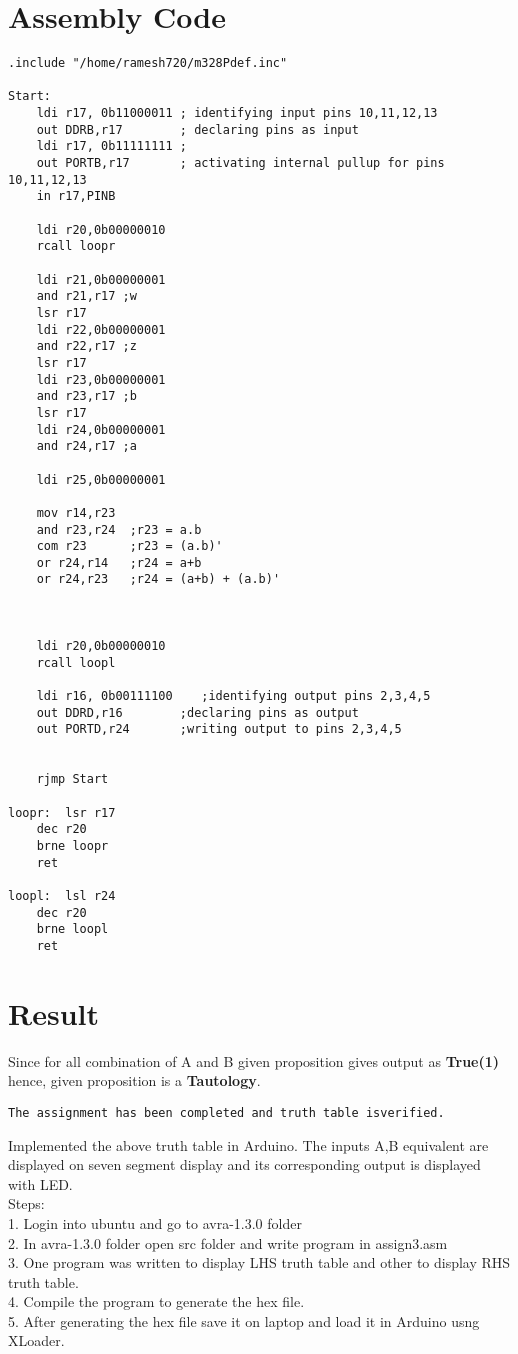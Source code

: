 \documentclass{article}
\begin{document}
\section{Assembly Code}
\begin{verbatim}
.include "/home/ramesh720/m328Pdef.inc"

Start:
	ldi r17, 0b11000011 ; identifying input pins 10,11,12,13
	out DDRB,r17		; declaring pins as input
	ldi r17, 0b11111111 ;
	out PORTB,r17		; activating internal pullup for pins 10,11,12,13  
	in r17,PINB
	
	ldi r20,0b00000010
	rcall loopr
	
	ldi r21,0b00000001
	and r21,r17 ;w
	lsr r17
	ldi r22,0b00000001
	and r22,r17 ;z
	lsr r17
	ldi r23,0b00000001
	and r23,r17 ;b
	lsr r17
	ldi r24,0b00000001
	and r24,r17 ;a

	ldi r25,0b00000001
	
	mov r14,r23
	and r23,r24  ;r23 = a.b
	com r23      ;r23 = (a.b)'
	or r24,r14   ;r24 = a+b
	or r24,r23   ;r24 = (a+b) + (a.b)'



	ldi r20,0b00000010
	rcall loopl

	ldi r16, 0b00111100    ;identifying output pins 2,3,4,5
	out DDRD,r16		;declaring pins as output
	out PORTD,r24		;writing output to pins 2,3,4,5
	

	rjmp Start

loopr:	lsr r17
	dec r20
	brne loopr
	ret

loopl:	lsl r24
	dec r20
	brne loopl
	ret
\end{verbatim}

\section{Result}
Since for all combination of A and B given proposition gives output as \textbf{True(1)} hence, given proposition is a \textbf{Tautology}. 
\begin{verbatim}
The assignment has been completed and truth table isverified.
\end{verbatim}
Implemented the above truth table in Arduino. The inputs A,B equivalent are displayed on seven segment display and its corresponding output is displayed with LED.\\
Steps: \\
1. Login into ubuntu and go to avra-1.3.0 folder\\
2. In avra-1.3.0 folder open src folder and write program in assign3.asm\\
3. One program was written to display LHS truth table and other to display RHS truth table.\\
4. Compile the program to generate the hex file.\\
5. After generating the hex file save it on laptop and load it in Arduino usng XLoader.\\
\end{document}
